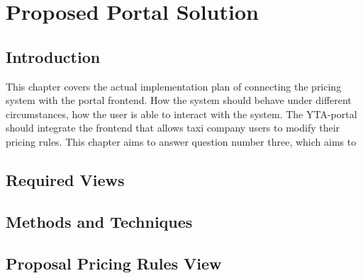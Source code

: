 \graphicspath{{Chapter5/Figs/Vector/}{Chapter5/Figs/}}

%
\chapter{Proposed Portal Solution}

%
\section{Introduction}
This chapter covers the actual implementation plan of connecting the pricing system with the portal frontend. How the system should behave under different circumstances, how the user is able to interact with the system. The YTA-portal should integrate the frontend that allows taxi company users to modify their pricing rules. This chapter aims to answer question number three, which aims to

%
\section{Required Views}


%
%
\section{Methods and Techniques}

%
%
\section{Proposal Pricing Rules View}

